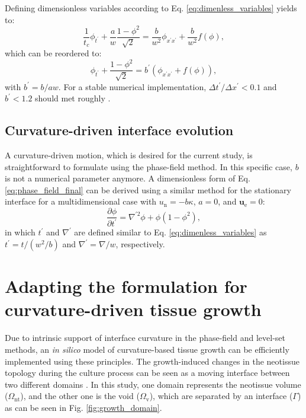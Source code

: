 Defining dimensionless variables according to Eq. \ref{eq:dimenless_variables} yields to:
\begin{equation}
\frac{1}{t_c}\phi_{t^{\prime}}+\frac{a}{w} \frac{1-\phi^{2}}{\sqrt{2}}=\frac{b}{w^2} \phi_{x^{\prime}x^{\prime}} + \frac{b}{w^{2}}f(\phi),
\end{equation}
which can be reordered to:
\begin{equation}
\phi_{t^{\prime}}+\frac{1-\phi^{2}}{\sqrt{2}}=b^{\prime}\left( \phi_{x^{\prime}x^{\prime}} + f(\phi)\right),
\end{equation}
with $b^{\prime}=b/aw$. For a stable numerical implementation, $\Delta t^{\prime}/\Delta x^{\prime} < 0.1$ and $b^{\prime} < 1.2$ should met roughly \cite{Sun2007}.


\subsection{Curvature-driven interface evolution}

A curvature-driven motion, which is desired for the current study, is straightforward to formulate using the phase-field method. In this specific case, $b$ is not a numerical parameter anymore. A dimensionless form of Eq. \ref{eq:phase_field_final} can be derived using a similar method for the stationary interface for a multidimensional case with $u_{\mathrm{n}}=-b\kappa$, $a=0$, and $\boldsymbol{u}_{\mathrm{e}}=0$:
\begin{equation} \label{eq:pf_curvature}
\frac{\partial \phi}{\partial t^{\prime}}=\nabla^{\prime 2} \phi+\phi\left(1-\phi^{2}\right),
\end{equation}
in which $t^{\prime}$ and $\nabla^{\prime}$ are defined similar to Eq. \ref{eq:dimenless_variables} as $t^{\prime}=t/(w^2/b)$ and $\nabla^{\prime}=\nabla/w$, respectively.

\section{Adapting the formulation for  curvature-driven tissue growth}

Due to intrinsic support of interface curvature in the phase-field and level-set methods, an \textit{in silico} model of curvature-based tissue growth can be efficiently implemented using these principles. The growth-induced changes in the neotissue topology during the culture process can be seen as a moving interface between two different domains \cite{Rumpler2008}. In this study, one domain represents the neotissue volume  ($\Omega_{\text{nt}}$), and the other one is the void ($\Omega_{\text{v}}$), which are separated by an interface ($\Gamma$) as can be seen in Fig. \ref{fig:growth_domain}.

